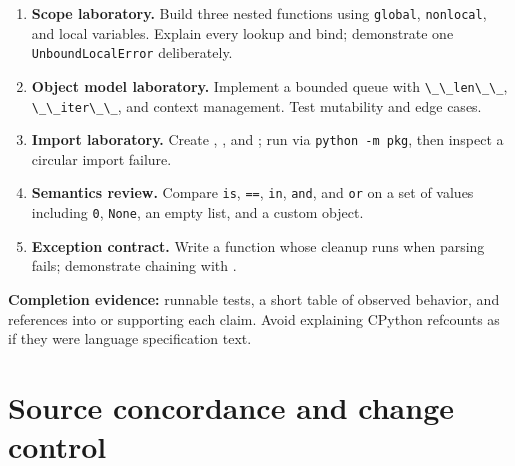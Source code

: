 \documentclass[
  11pt,
]{report}
\newcommand{\passthrough}[1]{#1}
\providecommand{\tightlist}{%
  \setlength{\itemsep}{0pt}\setlength{\parskip}{0pt}}
\begin{document}
\begin{enumerate}
\def\labelenumi{\arabic{enumi}.}
\tightlist
\item
  \textbf{Scope laboratory.} Build three nested functions using
  \passthrough{\lstinline!global!}, \passthrough{\lstinline!nonlocal!},
  and local variables. Explain every lookup and bind; demonstrate one
  \passthrough{\lstinline!UnboundLocalError!} deliberately.
\item
  \textbf{Object model laboratory.} Implement a bounded queue with
  \passthrough{\lstinline!\_\_len\_\_!},
  \passthrough{\lstinline!\_\_iter\_\_!}, and context management. Test
  mutability and edge cases.
\item
  \textbf{Import laboratory.} Create
  ,
  , and
  ; run via
  \passthrough{\lstinline!python -m pkg!}, then inspect a circular
  import failure.
\item
  \textbf{Semantics review.} Compare \passthrough{\lstinline!is!},
  \passthrough{\lstinline!==!}, \passthrough{\lstinline!in!},
  \passthrough{\lstinline!and!}, and \passthrough{\lstinline!or!} on a
  set of values including \passthrough{\lstinline!0!},
  \passthrough{\lstinline!None!}, an empty list, and a custom object.
\item
  \textbf{Exception contract.} Write a function whose cleanup runs when
  parsing fails; demonstrate chaining with
  .
\end{enumerate}

\textbf{Completion evidence:} runnable tests, a short table of observed
behavior, and references into 
or  supporting each claim. Avoid
explaining CPython refcounts as if they were language specification
text.

\chapter{Source concordance and change
control}\label{source-concordance-and-change-control}
\end{document}
